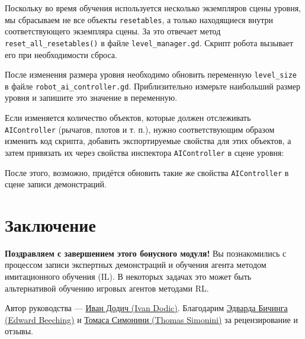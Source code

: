 \documentclass[11pt,a4paper]{article}
\begin{document}
Поскольку во время обучения используется несколько экземпляров сцены уровня, мы сбрасываем не все объекты \passthrough{\lstinline!resetables!}, а только находящиеся внутри соответствующего экземпляра сцены. За это отвечает метод \passthrough{\lstinline!reset_all_resetables()!} в файле \passthrough{\lstinline!level_manager.gd!}. Скрипт робота вызывает его при необходимости сброса.

После изменения размера уровня необходимо обновить переменную \passthrough{\lstinline!level_size!} в файле \passthrough{\lstinline!robot_ai_controller.gd!}. Приблизительно измерьте наибольший размер уровня и запишите это значение в переменную.

Если изменяется количество объектов, которые должен отслеживать \passthrough{\lstinline!AIController!} (рычагов, плотов и т. п.), нужно соответствующим образом изменить код скрипта, добавить экспортируемые свойства для этих объектов, а затем привязать их через свойства инспектора \passthrough{\lstinline!AIController!} в сцене уровня:


После этого, возможно, придётся обновить такие же свойства \passthrough{\lstinline!AIController!} в сцене записи демонстраций.

\section{Заключение}\label{conclusion}

\textbf{Поздравляем с завершением этого бонусного модуля!} Вы познакомились с процессом записи экспертных демонстраций и обучения агента методом имитационного обучения (IL). В некоторых задачах это может быть альтернативой обучению игровых агентов методами RL.

Автор руководства --- \href{https://github.com/Ivan-267}{Иван Додич (Ivan Dodic)}. Благодарим \href{https://twitter.com/edwardbeeching}{Эдварда Бичинга (Edward Beeching)} и \href{https://twitter.com/thomassimonini}{Томаса Симонини (Thomas Simonini)} за рецензирование и отзывы.
\end{document}
